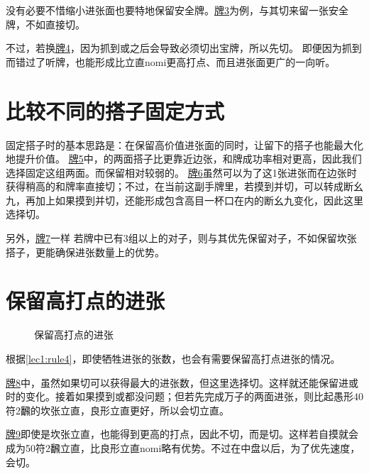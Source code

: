 没有必要不惜缩小进张面也要特地保留安全牌。\hyperref[lec7:pai3]{牌3}为例，与其切来留一张安全牌，不如直接切。

不过，若换\hyperref[lec7:pai4]{牌4}，因为抓到或之后会导致必须切出宝牌，所以先切。
即便因为抓到而错过了听牌，也能形成比立直nomi更高打点、而且进张面更广的一向听。


\section{比较不同的搭子固定方式}
固定搭子时的基本思路是：在保留高价值进张面的同时，让留下的搭子也能最大化地提升价值。
\hyperref[lec7:pai5-7]{牌5}中，的两面搭子比更靠近边张，和牌成功率相对更高，因此我们选择固定这组两面。而保留相对较弱的。
\hyperref[lec7:pai5-7]{牌6}虽然可以为了这1张进张而在边张时获得稍高的和牌率直接切；不过，在当前这副手牌里，若摸到并切，可以转成断幺九，再加上如果摸到并切，还能形成包含高目一杯口在内的断幺九变化，因此这里选择切。

另外，\hyperref[lec7:pai5-7]{牌7}一样
若牌中已有3组以上的对子，则与其优先保留对子，不如保留坎张搭子，更能确保进张数量上的优势。

\section{保留高打点的进张}
\begin{figure}[h]
    \caption{保留高打点的进张}
    \label{lec7:pai8-10}
    \par\bigskip
    \par\bigskip
\end{figure}
根据\ref{lec1:rule4}，即使牺牲进张的张数，也会有需要保留高打点进张的情况。

\hyperref[lec7:pai8-10]{牌8}中，虽然如果切可以获得最大的进张数，但这里选择切。这样就还能保留进或时的变化。接着如果摸到或都没问题；但若先完成万子的两面进张，则比起愚形40符2飜的坎张立直，良形立直更好，所以会切立直。

\hyperref[lec7:pai8-10]{牌9}即使是坎张立直，也能得到更高的打点，因此不切，而是切。这样若自摸就会成为50符2飜立直，比良形立直nomi略有优势。不过在中盘以后，为了优先速度，会切。

